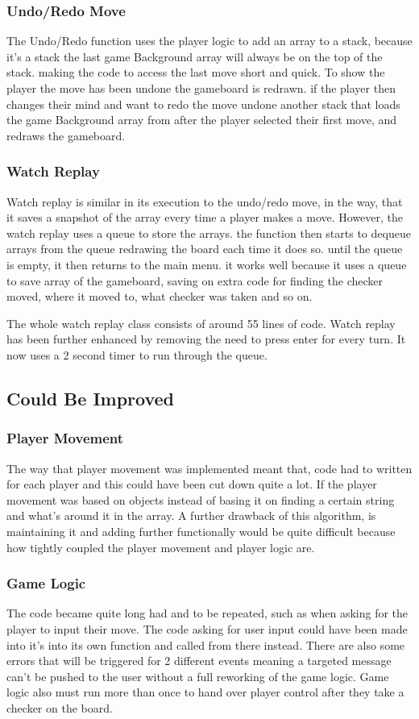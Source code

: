 \documentclass[10pt, a4paper]{article}
\begin{document}
	\subsubsection{Undo/Redo Move}
The Undo/Redo function uses the player logic to add an array to a stack, because it's a stack the last game Background array will always be on the top of the stack. making the code to access the last move short and quick. To show the player the move has been undone the gameboard is redrawn. if the player then changes their mind and want to redo the move undone another stack that loads the game Background array from after the player selected their first move, and redraws the gameboard. 
	\subsubsection{Watch Replay}
Watch replay is similar in its execution to the undo/redo move, in the way, that it saves a snapshot of the array every time a player makes a move. However, the watch replay uses a queue to store the arrays. the function then starts to dequeue arrays from the queue redrawing the board each time it does so. until the queue is empty, it then returns to the main menu. it works well because it uses a queue to save array of the gameboard, saving on extra code for finding the checker moved, where it moved to, what checker was taken and so on.

The whole watch replay class consists of around 55 lines of code. Watch replay has been further enhanced by removing the need to press enter for every turn. It now uses a 2 second timer to run through the queue.  
	\subsection{Could Be Improved}
	\subsubsection{Player Movement}
The way that player movement was implemented meant that, code had to written for each player and this could have been cut down quite a lot. If the player movement was based on objects instead of basing it on finding a certain string and what's around it in the array. A further drawback of this algorithm, is maintaining it and adding further functionally would be quite difficult because how tightly coupled the player movement and player logic are.
	
	\subsubsection{Game Logic}
The code became quite long had and to be repeated, such as when asking for the player to input their move. The code asking for user input could have been made into it's into its own function and called from there instead. There are also some errors that will be triggered for 2 different events meaning a targeted message can't be pushed to the user without a full reworking of the game logic. Game logic also must run more than once to hand over player control after they take a checker on the board.
	
\end{document}
